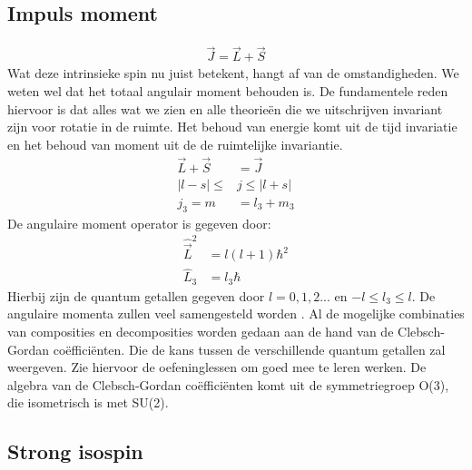\documentclass[../main.tex]{subfiles}
\begin{document}
\subsection{Impuls moment}%
\label{sub:impuls_moment}

\begin{equation}
    \begin{aligned}
        \label{eq:impuls_moment}
        \vec{J}=\vec{L}+\vec{S}
    \end{aligned}
\end{equation}
Wat deze intrinsieke spin nu juist betekent, hangt af van de omstandigheden. We weten wel dat het totaal angulair moment behouden is. De fundamentele reden hiervoor is dat alles wat we zien en alle theorieën die we uitschrijven invariant zijn voor rotatie in de ruimte. Het behoud van energie komt uit de tijd invariatie en het behoud van moment uit de de ruimtelijke invariantie.\\
\begin{equation}
    \begin{aligned}
        \label{eq:samengesteld_moment}
        \vec{L} + \vec{S} &= \vec{J}\\
        |l-s| \leq &j \leq |l+s|\\
        j_3=m&=l_3+m_3
    \end{aligned}
\end{equation}
De angulaire moment operator is gegeven door:
\begin{equation}
    \begin{aligned}
        \label{eq:ang_mom_op}
        \hat{\vec{L}}^2&=l(l+1)\hbar^2\\
        \hat{L}_3&=l_3\hbar
    \end{aligned}
\end{equation}
Hierbij zijn de quantum getallen gegeven door $l=0,1,2...$ en $-l\leq l_3\leq l$. De angulaire momenta zullen veel samengesteld worden . Al de mogelijke combinaties van composities en decomposities worden gedaan aan de hand van de Clebsch-Gordan coëfficiënten. Die de kans tussen de verschillende quantum getallen zal weergeven. Zie hiervoor de oefeninglessen om goed mee te leren werken. De algebra van de Clebsch-Gordan coëfficiënten komt uit de symmetriegroep O(3), die isometrisch is met SU(2). 

\subsection{Strong isospin}%
\label{sub:strong_isospin}
\end{document}
